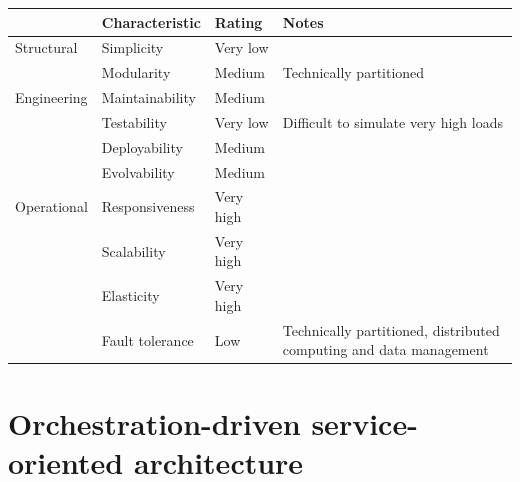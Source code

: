 \begin{table}[h!]
  \renewcommand{\arraystretch}{1.4}
  \centering
  \begin{tabular}{l l l l}
    \toprule
    \textbf{}   & \textbf{Characteristic} & \textbf{Rating} & \textbf{Notes}                                                     \\
    \midrule
    Structural  & Simplicity              & Very low        &                                                                    \\
                & Modularity              & Medium          & Technically partitioned                                            \\
    \midrule
    Engineering & Maintainability         & Medium          &                                                                    \\
                & Testability             & Very low        & Difficult to simulate very high loads                              \\
                & Deployability           & Medium          &                                                                    \\
                & Evolvability            & Medium          &                                                                    \\
    \midrule
    Operational & Responsiveness          & Very high       &                                                                    \\
                & Scalability             & Very high       &                                                                    \\
                & Elasticity              & Very high       &                                                                    \\
                & Fault tolerance         & Low             & Technically partitioned, distributed computing and data management \\
    \bottomrule
  \end{tabular}
\end{table}



\section{Orchestration-driven service-oriented architecture}

